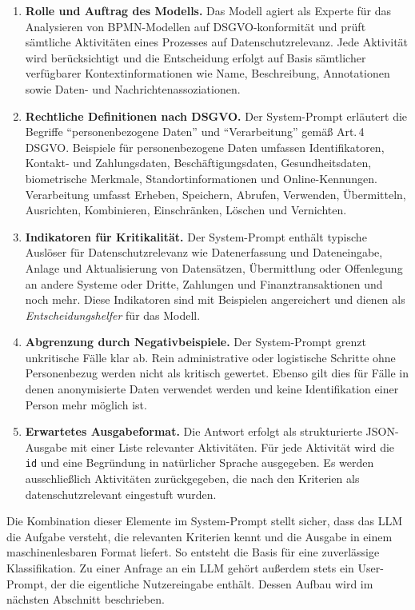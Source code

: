 \begin{enumerate}
    \item \textbf{Rolle und Auftrag des Modells.} Das Modell agiert als Experte für das Analysieren von \ac{BPMN}-Modellen auf \ac{DSGVO}-konformität und prüft sämtliche Aktivitäten eines Prozesses auf Datenschutzrelevanz. Jede Aktivität wird berücksichtigt und die Entscheidung erfolgt auf Basis sämtlicher verfügbarer Kontextinformationen wie Name, Beschreibung, Annotationen sowie Daten- und Nachrichtenassoziationen.
    \item \textbf{Rechtliche Definitionen nach \ac{DSGVO}.} Der System-Prompt erläutert die Begriffe \enquote{personenbezogene Daten} und \enquote{Verarbeitung} gemäß Art.\,4 \ac{DSGVO}. Beispiele für personenbezogene Daten umfassen Identifikatoren, Kontakt- und Zahlungsdaten, Beschäftigungsdaten, Gesundheitsdaten, biometrische Merkmale, Standortinformationen und Online-Kennungen. Verarbeitung umfasst Erheben, Speichern, Abrufen, Verwenden, Übermitteln, Ausrichten, Kombinieren, Einschränken, Löschen und Vernichten.
    \item \textbf{Indikatoren für Kritikalität.} Der System-Prompt enthält typische Auslöser für Datenschutzrelevanz wie Datenerfassung und Dateneingabe, Anlage und Aktualisierung von Datensätzen, Übermittlung oder Offenlegung an andere Systeme oder Dritte, Zahlungen und Finanztransaktionen und noch mehr. Diese Indikatoren sind mit Beispielen angereichert und dienen als \emph{Entscheidungshelfer} für das Modell.
    \item \textbf{Abgrenzung durch Negativbeispiele.} Der System-Prompt grenzt unkritische Fälle klar ab. Rein administrative oder logistische Schritte ohne Personenbezug werden nicht als kritisch gewertet. Ebenso gilt dies für Fälle in denen anonymisierte Daten verwendet werden und keine Identifikation einer Person mehr möglich ist.
    \item \textbf{Erwartetes Ausgabeformat.} Die Antwort erfolgt als strukturierte JSON-\hspace{0pt}Ausgabe mit einer Liste relevanter Aktivitäten. Für jede Aktivität wird die \texttt{id} und eine Begründung in natürlicher Sprache ausgegeben. Es werden ausschließlich Aktivitäten zurückgegeben, die nach den Kriterien als datenschutzrelevant eingestuft wurden.
\end{enumerate}

Die Kombination dieser Elemente im System-Prompt stellt sicher, dass das \ac{LLM} die Aufgabe versteht, die relevanten Kriterien kennt und die Ausgabe in einem maschinenlesbaren Format liefert. So entsteht die Basis für eine zuverlässige Klassifikation. Zu einer Anfrage an ein \ac{LLM} gehört außerdem stets ein User-Prompt, der die eigentliche Nutzereingabe enthält. Dessen Aufbau wird im nächsten Abschnitt beschrieben.

